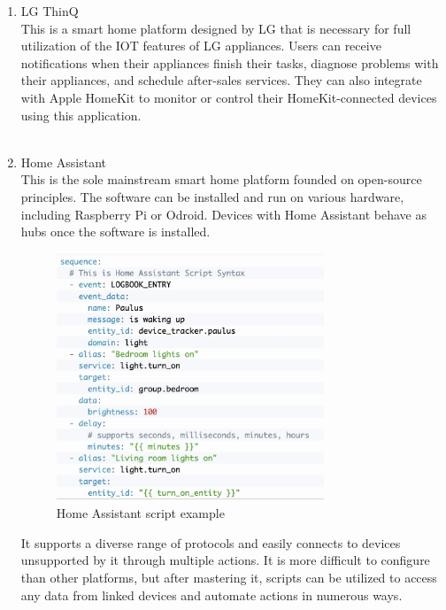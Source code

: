 \begin{enumerate}[label=\alph*]
    \item LG ThinQ\\
          This is a smart home platform designed by LG that is necessary for full utilization of the IOT features of LG appliances. Users can receive notifications when their appliances finish their tasks, diagnose problems with their appliances, and schedule after-sales services. They can also integrate with Apple HomeKit to monitor or control their HomeKit-connected devices using this application.\\\\


    \item Home Assistant\\
          This is the sole mainstream smart home platform founded on open-source principles. The software can be installed and run on various hardware, including Raspberry Pi or Odroid. Devices with Home Assistant behave as hubs once the software is installed.\\

          \begin{figure}[ht]
              \begin{center}
                  \raggedleft
                  \includegraphics[width=8cm]{imgs/introduction/ha_script_example.png}
                  \caption{Home Assistant script example}
                  \renewcommand{\thefigure}{\thesubsection.\arabic{figure}}
              \end{center}
          \end{figure}

          It supports a diverse range of protocols and easily connects to devices unsupported by it through multiple actions. It is more difficult to configure than other platforms, but after mastering it, scripts can be utilized to access any data from linked devices and automate actions in numerous ways.\\


\end{enumerate}